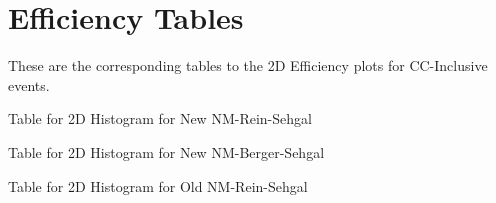 \documentclass[11pt]{article}
\begin{document}



\section{Efficiency Tables} \label{sec:EffTab}

These are the corresponding tables to the 2D Efficiency plots for CC-Inclusive events.

\newpage
\begin{landscape}
\begin{table}
\centering
\caption{Table for 2D Histogram for New NM-Rein-Sehgal}
\begin{adjustbox}{width=\paperwidth}
\end{adjustbox}
\end{table}
\end{landscape}

\newpage
\begin{landscape}
\begin{table}
\centering
\caption{Table for 2D Histogram for New NM-Berger-Sehgal}
\begin{adjustbox}{width=\paperwidth}
\end{adjustbox}
\end{table}
\end{landscape}

\newpage
\begin{landscape}
\begin{table}
\centering
\caption{Table for 2D Histogram for Old NM-Rein-Sehgal}
\begin{adjustbox}{width=\paperwidth}
\end{adjustbox}
\end{table}
\end{landscape}
\end{document}
